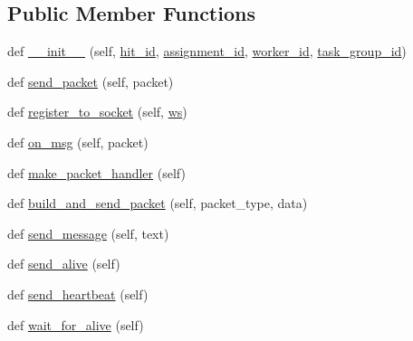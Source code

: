 \subsection*{Public Member Functions}
\begin{DoxyCompactItemize}
\item 
def \hyperlink{classparlai_1_1mturk_1_1core_1_1test_1_1test__full__system_1_1MockAgent_a68f39f241ca2ab60cc7bb93b282e84d7}{\+\_\+\+\_\+init\+\_\+\+\_\+} (self, \hyperlink{classparlai_1_1mturk_1_1core_1_1test_1_1test__full__system_1_1MockAgent_a5666933fe3bc64ea6c62f5858a49dc4c}{hit\+\_\+id}, \hyperlink{classparlai_1_1mturk_1_1core_1_1test_1_1test__full__system_1_1MockAgent_a1e12e948ec83c4f9c58fa91dc34f5286}{assignment\+\_\+id}, \hyperlink{classparlai_1_1mturk_1_1core_1_1test_1_1test__full__system_1_1MockAgent_a13e0be9e86b661e6a03f80feb8025816}{worker\+\_\+id}, \hyperlink{classparlai_1_1mturk_1_1core_1_1test_1_1test__full__system_1_1MockAgent_a4eb37280153b115ffd6c412a7b1d8973}{task\+\_\+group\+\_\+id})
\item 
def \hyperlink{classparlai_1_1mturk_1_1core_1_1test_1_1test__full__system_1_1MockAgent_a0a286b82f9e0758cdfabf9b7fb51e6b6}{send\+\_\+packet} (self, packet)
\item 
def \hyperlink{classparlai_1_1mturk_1_1core_1_1test_1_1test__full__system_1_1MockAgent_aa3aaa3fa10d7f1ca6a135bcd28e18be4}{register\+\_\+to\+\_\+socket} (self, \hyperlink{classparlai_1_1mturk_1_1core_1_1test_1_1test__full__system_1_1MockAgent_a2870f5b01b6d901d44d2dae99ff6a263}{ws})
\item 
def \hyperlink{classparlai_1_1mturk_1_1core_1_1test_1_1test__full__system_1_1MockAgent_a2186b39ea12603dd9c80ca0fca2e6892}{on\+\_\+msg} (self, packet)
\item 
def \hyperlink{classparlai_1_1mturk_1_1core_1_1test_1_1test__full__system_1_1MockAgent_a872f69350ed59fcccfa5819f2bd65337}{make\+\_\+packet\+\_\+handler} (self)
\item 
def \hyperlink{classparlai_1_1mturk_1_1core_1_1test_1_1test__full__system_1_1MockAgent_aea4e710be39de9f90e3dd9b9b6882874}{build\+\_\+and\+\_\+send\+\_\+packet} (self, packet\+\_\+type, data)
\item 
def \hyperlink{classparlai_1_1mturk_1_1core_1_1test_1_1test__full__system_1_1MockAgent_a6eaaac34d4b7644c88bab53eeb12ebb1}{send\+\_\+message} (self, text)
\item 
def \hyperlink{classparlai_1_1mturk_1_1core_1_1test_1_1test__full__system_1_1MockAgent_a7a0ba09a58ea21ac86db4b501c392a33}{send\+\_\+alive} (self)
\item 
def \hyperlink{classparlai_1_1mturk_1_1core_1_1test_1_1test__full__system_1_1MockAgent_a42f7589517cdf4c6a10b9a80e9afea1a}{send\+\_\+heartbeat} (self)
\item 
def \hyperlink{classparlai_1_1mturk_1_1core_1_1test_1_1test__full__system_1_1MockAgent_a92e5fffe32ac3011adeedbdc34b5506c}{wait\+\_\+for\+\_\+alive} (self)
\end{DoxyCompactItemize}
